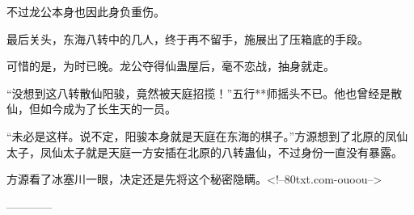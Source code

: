 \begin{this_body}
不过龙公本身也因此身负重伤。

最后关头，东海八转中的几人，终于再不留手，施展出了压箱底的手段。

可惜的是，为时已晚。龙公夺得仙蛊屋后，毫不恋战，抽身就走。

“没想到这八转散仙阳骏，竟然被天庭招揽！”五行**师摇头不已。他也曾经是散仙，但如今成为了长生天的一员。

“未必是这样。说不定，阳骏本身就是天庭在东海的棋子。”方源想到了北原的凤仙太子，凤仙太子就是天庭一方安插在北原的八转蛊仙，不过身份一直没有暴露。

方源看了冰塞川一眼，决定还是先将这个秘密隐瞒。<!--80txt.com-ouoou-->

------------

\end{this_body}


